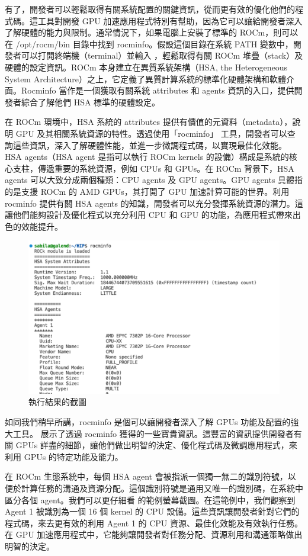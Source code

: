 有了，開發者可以輕鬆取得有關系統配置的關鍵資訊，從而更有效的優化他們的程式碼。這工具對開發 GPU 加速應用程式特別有幫助，因為它可以讓給開發者深入了解硬體的能力與限制。通常情況下，如果電腦上安裝了標準的 ROCm，則可以在 /opt/rocm/bin 目錄中找到 rocminfo。假設這個目錄在系統 PATH 變數中，開發者可以打開終端機（terminal）並輸入 ，輕鬆取得有關 ROCm 堆疊（stack）及硬體的設定資訊。ROCm 本身建立在異質系統架構（HSA, the Heterogeneous System Architecture）之上，它定義了異質計算系統的標準化硬體架構和軟體介面。Rocminfo 當作是一個獲取有關系統 attributes 和 agents 資訊的入口，提供開發者綜合了解他們 HSA 標準的硬體設定。

在 ROCm 環境中，HSA 系統的 attributes 提供有價值的元資料（metadata），說明 GPU 及其相關系統資源的特性。透過使用「rocminfo」 工具，開發者可以查詢這些資訊，深入了解硬體性能，並進一步微調程式碼，以實現最佳化效能。HSA agents（HSA agent 是指可以執行 ROCm kernels 的設備）構成是系統的核心支柱，傳遞重要的系統資源，例如 CPUs 和 GPUs。在 ROCm 背景下，HSA agents 可以大致分成兩個種類：CPU agents 及 GPU agents。GPU agents 具體指的是支援 ROCm 的 AMD GPUs，其打開了 GPU 加速計算可能的世界。利用 rocminfo 提供有關 HSA agents 的知識，開發者可以充分發揮系統資源的潛力。這讓他們能夠設計及優化程式以充分利用 CPU 和 GPU 的功能，為應用程式帶來出色的效能提升。

\begin{figure}
    \centering
    \includegraphics[width=0.75\linewidth]{FileAusiliari/Screenshots/Figure7-1.png}
    \caption{執行結果的截圖}
    \label{fig:rocminfo}
\end{figure}

如同我們稍早所講，rocminfo 是個可以讓開發者深入了解 GPUs 功能及配置的強大工具。 展示了透過 rocminfo 獲得的一些寶貴資訊。這豐富的資訊提供開發者有關 GPUs 詳盡的細節，讓他們做出明智的決定、優化程式碼及微調應用程式，來利用 GPUs 的特定功能及能力。

在 ROCm 生態系統中，每個 HSA agent 會被指派一個獨一無二的識別符號，以便於計算任務的溝通及資源分配。這個識別符號是通用又唯一的識別碼，在系統中區分各個 agent。我們可以更仔細看  的範例螢幕截圖。在這範例中，我們觀察到 Agent 1 被識別為一個 16 個 kernel 的 CPU 設備。這些資訊讓開發者針對它們的程式碼，來去更有效的利用 Agent 1 的 CPU 資源、最佳化效能及有效執行任務。在 GPU 加速應用程式中，它能夠讓開發者對任務分配、資源利用和溝通策略做出明智的決定。

